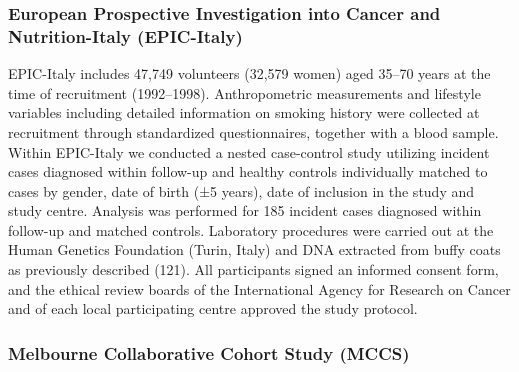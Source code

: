 \documentclass[11pt,oneside]{bristolthesis}
\begin{document}
\hypertarget{european-prospective-investigation-into-cancer-and-nutrition-italy-epic-italy}{%
\subsubsection{European Prospective Investigation into Cancer and Nutrition-Italy (EPIC-Italy)}\label{european-prospective-investigation-into-cancer-and-nutrition-italy-epic-italy}}

EPIC-Italy includes 47,749 volunteers (32,579 women) aged 35--70 years at the time of recruitment (1992--1998). Anthropometric measurements and lifestyle variables including detailed information on smoking history were collected at recruitment through standardized questionnaires, together with a blood sample. Within EPIC-Italy we conducted a nested case-control study utilizing incident cases diagnosed within follow-up and healthy controls individually matched to cases by gender, date of birth (±5 years), date of inclusion in the study and study centre. Analysis was performed for 185 incident cases diagnosed within follow-up and matched controls. Laboratory procedures were carried out at the Human Genetics Foundation (Turin, Italy) and DNA extracted from buffy coats as previously described (121). All participants signed an informed consent form, and the ethical review boards of the International Agency for Research on Cancer and of each local participating centre approved the study protocol.

\hypertarget{melbourne-collaborative-cohort-study-mccs}{%
\subsubsection{Melbourne Collaborative Cohort Study (MCCS)}\label{melbourne-collaborative-cohort-study-mccs}}
\end{document}
